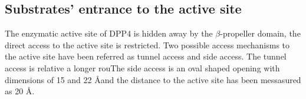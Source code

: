\subsection{Substrates' entrance to the active site}

The enzymatic active site of DPP4 is hidden away by the $\beta$-propeller domain, the direct access to the active site is restricted. Two possible access mechanisms to the active site have been referred as tunnel access and side access. The tunnel access is relative a longer rouThe side access is an oval shaped opening with dimensions of 15 and 22 \AA and the distance to the active site has been messasured as 20 \AA.~\cite{Engel_2003}